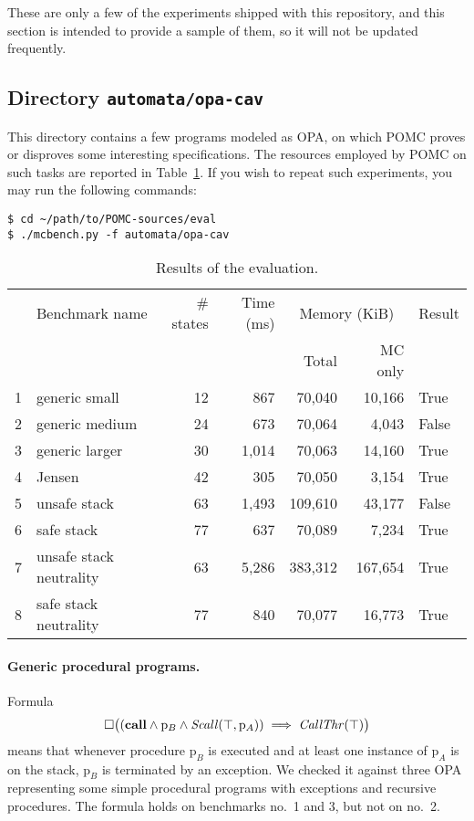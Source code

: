 \documentclass[9pt,a4paper]{article}
\begin{document}
These are only a few of the experiments shipped with this repository,
and this section is intended to provide a sample of them,
so it will not be updated frequently.

\subsection{Directory \texttt{automata/opa-cav}}
\label{sec:exp-opa}

This directory contains a few programs modeled as OPA,
on which POMC proves or disproves some interesting specifications.
The resources employed by POMC on such tasks are reported in Table~\ref{tab:eval}.
If you wish to repeat such experiments, you may run the following
commands:
\begin{verbatim}
$ cd ~/path/to/POMC-sources/eval
$ ./mcbench.py -f automata/opa-cav
\end{verbatim}

\begin{table}
  \centering
  \begin{tabular}{| r | l | r | r | r | r | l |}
    \hline
    & Benchmark name & \# states & Time (ms) & \multicolumn{2}{c|}{Memory (KiB)} & Result \\
    \cline{5-6}
    & & & & Total & MC only & \\
    \hline
    1 & generic small & 12 & 867 & 70,040 & 10,166 & True \\
    2 & generic medium & 24 & 673 & 70,064 & 4,043 & False \\
    3 & generic larger & 30 & 1,014 & 70,063 & 14,160 & True \\
    4 & Jensen & 42 & 305 & 70,050 & 3,154 & True \\
    5 & unsafe stack & 63 & 1,493 & 109,610 & 43,177 & False \\
    6 & safe stack & 77 & 637 & 70,089 & 7,234 & True \\
    7 & unsafe stack neutrality & 63 & 5,286 & 383,312 & 167,654 & True \\
    8 & safe stack neutrality & 77 & 840 & 70,077 & 16,773 & True \\
    \hline
  \end{tabular}
  \caption{Results of the evaluation.}
  \label{tab:eval}
\end{table}

\paragraph{Generic procedural programs.}
Formula
\[
  \square \big((\mathbf{call} \land \mathrm{p}_B \land
    \mathit{Scall}(\top, \mathrm{p}_A))
    \implies \mathit{CallThr}(\top) \big)
\]
means that whenever procedure $\mathrm{p}_B$ is executed and at least
one instance of $\mathrm{p}_A$ is on the stack, $\mathrm{p}_B$ is
terminated by an exception.  We checked it against three OPA
representing some simple procedural programs with exceptions and
recursive procedures.  The formula holds on benchmarks no.\ 1 and 3,
but not on no.\ 2.
\end{document}
